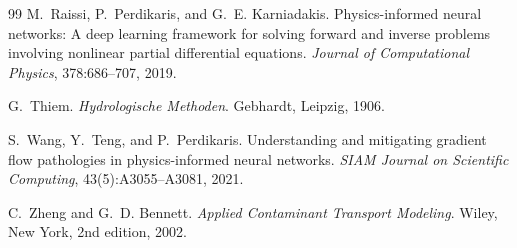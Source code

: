 \documentclass[11pt]{article}
\begin{document}
\begin{thebibliography}{99}
M.~Raissi, P.~Perdikaris, and G.~E. Karniadakis.
Physics-informed neural networks: A deep learning framework for solving forward
and inverse problems involving nonlinear partial differential equations.
\textit{Journal of Computational Physics}, 378:686--707, 2019.

G.~Thiem.
\textit{Hydrologische Methoden}.
Gebhardt, Leipzig, 1906.

S.~Wang, Y.~Teng, and P.~Perdikaris.
Understanding and mitigating gradient flow pathologies in physics-informed
neural networks.
\textit{SIAM Journal on Scientific Computing}, 43(5):A3055--A3081, 2021.

C.~Zheng and G.~D. Bennett.
\textit{Applied Contaminant Transport Modeling}.
Wiley, New York, 2nd edition, 2002.

\end{thebibliography}
\end{document}
